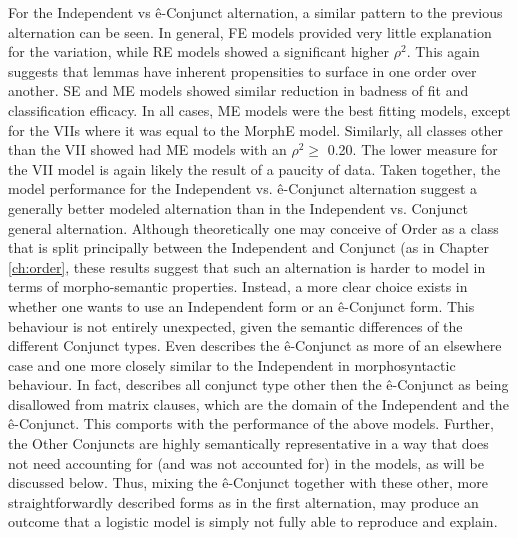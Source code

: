 For the Independent vs ê-Conjunct alternation, a similar pattern to the previous alternation can be seen. In general, FE models provided very little explanation for the variation, while RE models showed a significant higher $\rho^{2}$. This again suggests that lemmas have inherent propensities to surface in one order over another. SE and ME models showed similar reduction in badness of fit and classification efficacy. In all cases, ME models were the best fitting models, except for the VIIs where it was equal to the MorphE model. Similarly, all classes other than the VII showed had ME models with an $\rho^{2} \geq$ 0.20. The lower measure for the VII model is again likely the result of a paucity of data. Taken together, the model performance for the Independent vs. ê-Conjunct alternation suggest a generally better modeled alternation than in the Independent vs. Conjunct general alternation. Although theoretically one may conceive of Order as a class that is split principally between the Independent and Conjunct (as in Chapter \ref{ch:order}, these results suggest that such an alternation is harder to model in terms of morpho-semantic properties. Instead, a more clear choice exists in whether one wants to use an Independent form or an ê-Conjunct form. This behaviour is not entirely unexpected, given the semantic differences of the different Conjunct types. Even \citet{Cook2014} describes the ê-Conjunct as more of an elsewhere case and one more closely similar to the Independent in morphosyntactic behaviour. In fact, \citet[125]{Cook2014} describes all conjunct type other then the ê-Conjunct as being disallowed from matrix clauses, which are the domain of the Independent and the ê-Conjunct. This comports with the performance of the above models. Further, the Other Conjuncts are highly semantically representative in a way that does not need accounting for (and was not accounted for) in the models, as will be discussed below. Thus, mixing the ê-Conjunct together with these other, more straightforwardly described forms as in the first alternation, may produce an outcome that a logistic model is simply not fully able to reproduce and explain. 


